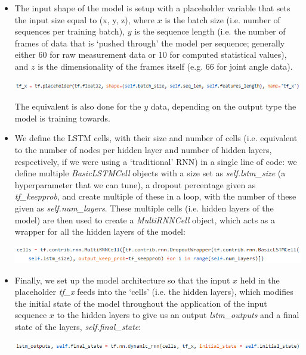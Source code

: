 \documentclass[12pt,twoside]{report}
\begin{document}
\begin{itemize}
	\item The input shape of the model is setup with a placeholder variable that sets the input size equal to (x, y, z), where $x$ is the batch size (i.e. number of sequences per training batch), $y$ is the sequence length (i.e. the number of frames of data that is ‘pushed through’ the model per sequence; generally either 60 for raw measurement data or 10 for computed statistical values), and $z$ is the dimensionality of the frames itself (e.g. 66 for joint angle data).
\begin{center}
\includegraphics[scale=0.8]{project_figures/fig3_12}
\end{center}
	The equivalent is also done for the $y$ data, depending on the output type the model is training towards.
	\item We define the LSTM cells, with their size and number of cells (i.e. equivalent to the number of nodes per hidden layer and number of hidden layers, respectively, if we were using a ‘traditional’ RNN) in a single line of code: we define multiple \textit{BasicLSTMCell} objects with a size set as \textit{self.lstm\_size} (a hyperparameter that we can tune), a dropout percentage given as \textit{tf\_keepprob}, and create multiple of these in a loop, with the number of these given as \textit{self.num\_layers}. These multiple cells (i.e. hidden layers of the model) are then used to create a \textit{MultiRNNCell} object, which acts as a wrapper for all the hidden layers of the model:
\begin{center}
\includegraphics[scale=0.6]{project_figures/fig3_13}
\end{center}
	\item Finally, we set up the model architecture so that the input $x$ held in the placeholder \textit{tf\_x} feeds into the ‘cells’ (i.e. the hidden layers), which modifies the initial state of the model throughout the application of the input sequence $x$ to the hidden layers to give us an output \textit{lstm\_outputs} and a final state of the layers, \textit{self.final\_state}:
\begin{center}
\includegraphics[scale=0.6]{project_figures/fig3_14}

\end{center}
\end{itemize}
\end{document}
